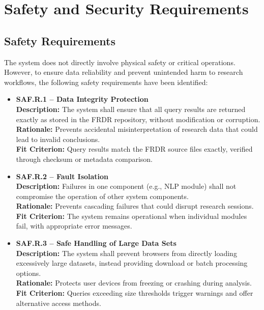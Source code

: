 \documentclass{article}
\begin{document}
\section{Safety and Security Requirements}


\subsection{Safety Requirements}
\par{The system does not directly involve physical safety or critical operations. However, to ensure data reliability and prevent unintended harm to research workflows, the following safety requirements have been identified:}
\begin{itemize}
    \item \textbf{SAF.R.1 -- Data Integrity Protection} \\
    \textbf{Description:} The system shall ensure that all query results are returned exactly as stored in the FRDR repository, without modification or corruption. \\
    \textbf{Rationale:} Prevents accidental misinterpretation of research data that could lead to invalid conclusions. \\
    \textbf{Fit Criterion:} Query results match the FRDR source files exactly, verified through checksum or metadata comparison.
    
    \item \textbf{SAF.R.2 -- Fault Isolation} \\
    \textbf{Description:} Failures in one component (e.g., NLP module) shall not compromise the operation of other system components. \\
    \textbf{Rationale:} Prevents cascading failures that could disrupt research sessions. \\
    \textbf{Fit Criterion:} The system remains operational when individual modules fail, with appropriate error messages.
    
    \item \textbf{SAF.R.3 -- Safe Handling of Large Data Sets} \\
    \textbf{Description:} The system shall prevent browsers from directly loading excessively large datasets, instead providing download or batch processing options. \\
    \textbf{Rationale:} Protects user devices from freezing or crashing during analysis. \\
    \textbf{Fit Criterion:} Queries exceeding size thresholds trigger warnings and offer alternative access methods.
\end{itemize}
\end{document}
